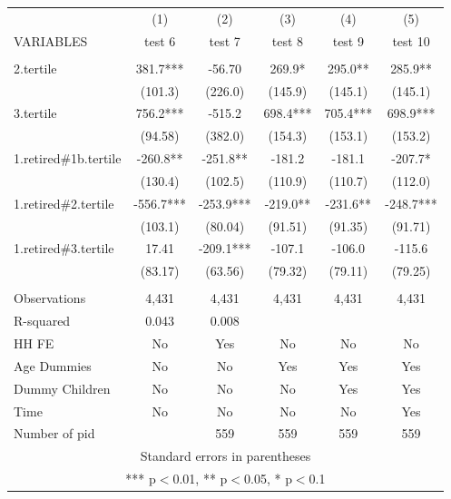 \begin{tabular}{lccccc} \hline
 & (1) & (2) & (3) & (4) & (5) \\
VARIABLES & test 6 & test 7 & test 8 & test 9 & test 10 \\ \hline
 &  &  &  &  &  \\
2.tertile & 381.7*** & -56.70 & 269.9* & 295.0** & 285.9** \\
 & (101.3) & (226.0) & (145.9) & (145.1) & (145.1) \\
3.tertile & 756.2*** & -515.2 & 698.4*** & 705.4*** & 698.9*** \\
 & (94.58) & (382.0) & (154.3) & (153.1) & (153.2) \\
1.retired\#1b.tertile & -260.8** & -251.8** & -181.2 & -181.1 & -207.7* \\
 & (130.4) & (102.5) & (110.9) & (110.7) & (112.0) \\
1.retired\#2.tertile & -556.7*** & -253.9*** & -219.0** & -231.6** & -248.7*** \\
 & (103.1) & (80.04) & (91.51) & (91.35) & (91.71) \\
1.retired\#3.tertile & 17.41 & -209.1*** & -107.1 & -106.0 & -115.6 \\
 & (83.17) & (63.56) & (79.32) & (79.11) & (79.25) \\
 &  &  &  &  &  \\
Observations & 4,431 & 4,431 & 4,431 & 4,431 & 4,431 \\
R-squared & 0.043 & 0.008 &  &  &  \\
HH FE & No & Yes & No & No & No \\
Age Dummies & No & No & Yes & Yes & Yes \\
Dummy Children & No & No & No & Yes & Yes \\
Time & No & No & No & No & Yes \\
 Number of pid &  & 559 & 559 & 559 & 559 \\ \hline
\multicolumn{6}{c}{ Standard errors in parentheses} \\
\multicolumn{6}{c}{ *** p$<$0.01, ** p$<$0.05, * p$<$0.1} \\
\end{tabular}
